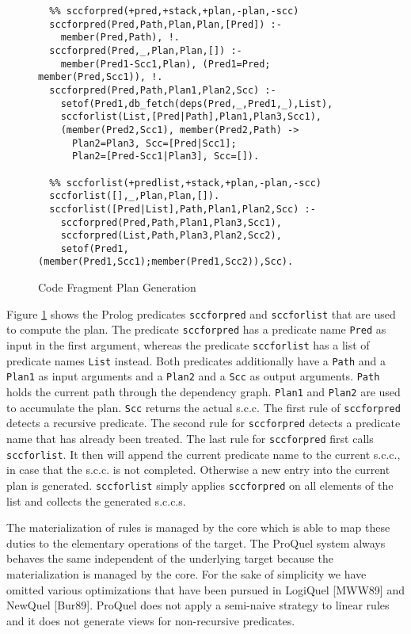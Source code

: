 \begin{figure}
{\small
\begin{verbatim}
  %% sccforpred(+pred,+stack,+plan,-plan,-scc)
  sccforpred(Pred,Path,Plan,Plan,[Pred]) :-
    member(Pred,Path), !.
  sccforpred(Pred,_,Plan,Plan,[]) :-
    member(Pred1-Scc1,Plan), (Pred1=Pred; member(Pred,Scc1)), !.
  sccforpred(Pred,Path,Plan1,Plan2,Scc) :-
    setof(Pred1,db_fetch(deps(Pred,_,Pred1,_),List),
    sccforlist(List,[Pred|Path],Plan1,Plan3,Scc1),
    (member(Pred2,Scc1), member(Pred2,Path) -> 
      Plan2=Plan3, Scc=[Pred|Scc1];
      Plan2=[Pred-Scc1|Plan3], Scc=[]).

  %% sccforlist(+predlist,+stack,+plan,-plan,-scc)
  sccforlist([],_,Plan,Plan,[]).
  sccforlist([Pred|List],Path,Plan1,Plan2,Scc) :-
    sccforpred(Pred,Path,Plan1,Plan3,Scc1),
    sccforpred(List,Path,Plan3,Plan2,Scc2),
    setof(Pred1,(member(Pred1,Scc1);member(Pred1,Scc2)),Scc).
\end{verbatim}
}
\caption{Code Fragment Plan Generation}
\label{prgplan}
\end{figure}

Figure \ref{prgplan} shows the Prolog predicates \verb.sccforpred. and \verb.sccforlist. that are
used to compute the plan. The predicate \verb.sccforpred. has a predicate name \verb.Pred. as input 
in the first argument, whereas the predicate \verb.sccforlist. has a list of predicate names
\verb.List. instead. Both predicates additionally have a \verb.Path. and a \verb.Plan1. as input 
arguments and a \verb.Plan2. and a \verb.Scc. as output arguments. \verb.Path. holds the current 
path through the dependency graph. \verb.Plan1. and \verb.Plan2. are used to accumulate the plan. 
\verb.Scc. returns the actual s.c.c. The first rule of \verb.sccforpred. detects a recursive 
predicate. The second rule for \verb.sccforpred. detects a predicate name that has already been 
treated. The last rule for \verb.sccforpred. first calls \verb.sccforlist.. It then will append the 
current predicate name to the current s.c.c., in case that the s.c.c. is not completed. Otherwise 
a new entry into the current plan is generated. \verb.sccforlist. simply applies 
\verb.sccforpred. on all elements of the list and collects the generated s.c.c.s.

\label{secmatr}
The materialization of rules is managed by the core which is able to map these duties to the 
elementary operations of the target. The ProQuel system always behaves the same independent 
of the underlying target because the materialization is managed by the core. For the 
sake of simplicity we have omitted various optimizations that have been pursued in LogiQuel [MWW89] 
and NewQuel [Bur89]. ProQuel does not apply a semi-naive strategy to linear rules and it does
not generate views for non-recursive predicates.

